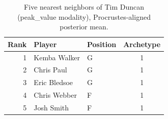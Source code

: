 \begin{table}[htbp]
  \centering\small
  \begin{tabular}{rllc}
    \toprule
    Rank & Player & Position & Archetype \\
    \midrule
    1 & Kemba Walker & G & 1 \\
    2 & Chris Paul & G & 1 \\
    3 & Eric Bledsoe & G & 1 \\
    4 & Chris Webber & F & 1 \\
    5 & Josh Smith & F & 1 \\
    \bottomrule
  \end{tabular}
  \caption{Five nearest neighbors of Tim Duncan (peak_value modality), Procrustes-aligned posterior mean.}
  \label{tab:Tim_Duncan_neighbors_peak_value}
\end{table}

